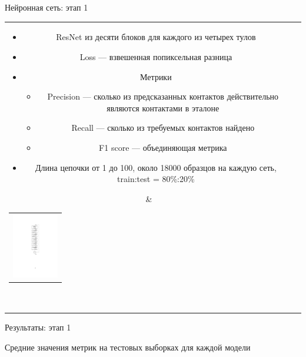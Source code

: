 \documentclass{beamer}
\begin{document}
\begin{frame}{Нейронная сеть: этап 1}

\setlength\tabcolsep{0.1pt}
\begin{tabular}{cl}  
    \parbox{0.85\linewidth}{
        \begin{itemize}
            \item ResNet из десяти блоков для каждого из четырех тулов
            \item Loss --- взвешенная попиксельная разница
             \item Метрики
            \begin{itemize}
                \item Precision --- сколько из предсказанных контактов действительно являются контактами в эталоне
                \item Recall --- сколько из требуемых контактов найдено
                \item F1 score --- объединяющая метрика
            \end{itemize}
        \item Длина цепочки от 1 до 100, около 18000 образцов на каждую сеть, train:test = 80\%:20\%
        \end{itemize}
    }
    & \begin{tabular}{l}
        \includegraphics[width=2.0cm]{pics/res_unit.pdf}
    \end{tabular}  \\
\end{tabular}
    
\end{frame}


\begin{frame}{Результаты: этап 1}

Средние значения метрик на тестовых выборках для каждой модели

\vspace{4mm}



\end{frame}
\end{document}
